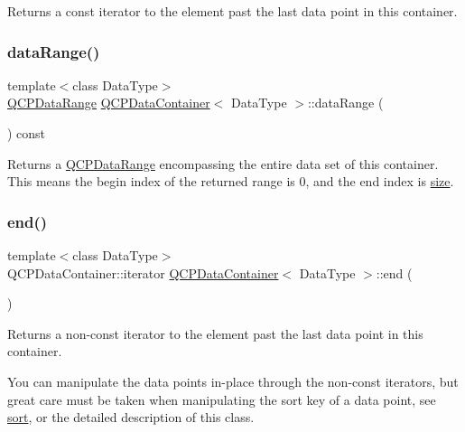 Returns a const iterator to the element past the last data point in this container. \mbox{\label{class_q_c_p_data_container_aece90eeb2ba8d3c46d3d94023630fbc7}} 
\subsubsection{\texorpdfstring{data\+Range()}{dataRange()}}
{\footnotesize\ttfamily template$<$class Data\+Type$>$ \\
\mbox{\hyperlink{class_q_c_p_data_range}{Q\+C\+P\+Data\+Range}} \mbox{\hyperlink{class_q_c_p_data_container}{Q\+C\+P\+Data\+Container}}$<$ Data\+Type $>$\+::data\+Range (\begin{DoxyParamCaption}{ }\end{DoxyParamCaption}) const\hspace{0.3cm}{\ttfamily [inline]}}

Returns a \mbox{\hyperlink{class_q_c_p_data_range}{Q\+C\+P\+Data\+Range}} encompassing the entire data set of this container. This means the begin index of the returned range is 0, and the end index is \mbox{\hyperlink{class_q_c_p_data_container_a8e9b262c739672e13472d0d45b720258}{size}}. \mbox{\label{class_q_c_p_data_container_acf66dfad83fe041380f5e0491e7676f2}} 
\subsubsection{\texorpdfstring{end()}{end()}}
{\footnotesize\ttfamily template$<$class Data\+Type$>$ \\
Q\+C\+P\+Data\+Container\+::iterator \mbox{\hyperlink{class_q_c_p_data_container}{Q\+C\+P\+Data\+Container}}$<$ Data\+Type $>$\+::end (\begin{DoxyParamCaption}{ }\end{DoxyParamCaption})\hspace{0.3cm}{\ttfamily [inline]}}

Returns a non-\/const iterator to the element past the last data point in this container.

You can manipulate the data points in-\/place through the non-\/const iterators, but great care must be taken when manipulating the sort key of a data point, see \mbox{\hyperlink{class_q_c_p_data_container_a75da92e33063b63d6da5014683591d45}{sort}}, or the detailed description of this class. \mbox{\label{class_q_c_p_data_container_a2ad8a5399072d99a242d3a6d2d7e278a}} 
